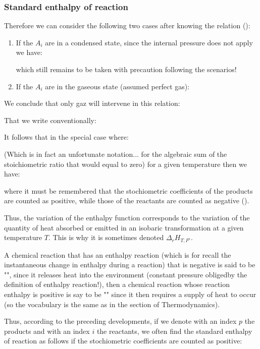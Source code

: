 	\subsubsection{Standard enthalpy of reaction}
	Therefore we can consider the following two cases after knowing the relation ():
	
	\begin{enumerate}
		\item If the $A_i$ are in a condensed state, since the internal pressure does not apply we have:
		
		which still remains to be taken with precaution following the scenarios!

		\item If the $A_i$ are in the gaseous state (assumed perfect gas):
		
	\end{enumerate}
	We conclude that only gaz will intervene in this relation:
	
	That we write conventionally:
	
	It follows that in the special case where:
	
	(Which is in fact an unfortunate notation... for the algebraic sum of the stoichiometric ratio that would equal to zero) for a given temperature then we have:
	
	where it must be remembered that the stochiometric coefficients of the products are counted as positive, while those of the reactants are counted as negative ().
	
	Thus, the variation of the enthalpy function corresponds to the variation of the quantity of heat absorbed or emitted in an isobaric transformation at a given temperature $T$. This is why it is sometimes denoted $\Delta_r H_{T,P^\circ}$.

	A chemical reaction that has an enthalpy reaction (which is for recall the instantaneous change in enthalpy during a reaction) that is negative is said to be "", since it releases heat into the environment (constant pressure obligedby the definition of enthalpy reaction!), then a chemical reaction whose reaction enthalpy is positive is say to be "" since it then requires a supply of heat to occur (so the vocabulary is the same as in the section of Thermodynamics).

	Thus, according to the preceding developments, if we denote with an index $p$ the products and with an index $i$ the reactants, we often find the standard enthalpy of reaction as follows if the stochiometric coefficients are counted as positive:
	
